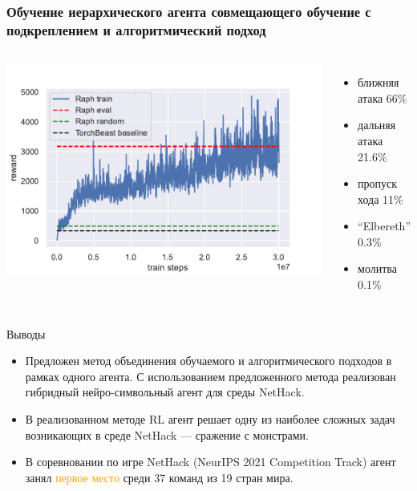 \begin{frame}
\frametitle{Обучение иерархического агента совмещающего обучение с подкреплением и алгоритмический подход}
\begin{columns}
\centering
\includegraphics[width=1\linewidth]{images/raph_train.pdf}
\begin{itemize}
    \item ближняя атака 66\%
    \item дальняя атака 21.6\%
    \item пропуск хода 11\%
    \item ``Elbereth'' 0.3\%
    \item молитва 0.1\%
\end{itemize}
\end{columns}
\end{frame}


\begin{frame}{Выводы}
\begin{itemize}
    \item[\textcolor{ForestGreen}{\checkmark}] Предложен метод объединения обучаемого и алгоритмического подходов в рамках одного агента. С использованием предложенного метода реализован гибридный нейро-символьный агент для среды NetHack.
    \item[\textcolor{ForestGreen}{\checkmark}] В реализованном методе RL агент решает одну из наиболее сложных задач возникающих в среде NetHack — сражение с монстрами.
    \item[\textcolor{ForestGreen}{\checkmark}] В соревновании по игре NetHack (NeurIPS 2021 Competition Track) агент занял \textcolor{orange}{первое место} среди 37 команд из 19 стран мира.
\end{itemize}
    
\end{frame}

